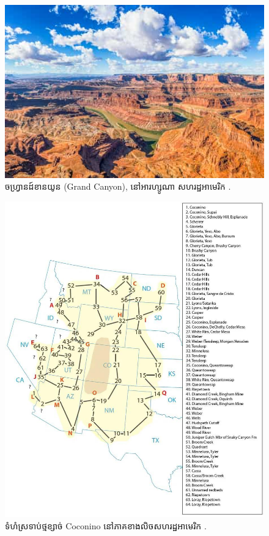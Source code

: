 \documentclass[10pt,twocolumn,letterpaper]{article}
\begin{document}
\begin{figure}[b]
\begin{center}
   \includegraphics[width=1\linewidth]{grand-canyon.jpg}

\end{center}
   \caption{ចហ្រ្វានដ៍ខានយូន (Grand Canyon), នៅអារហ្សូណា សហរដ្ឋអាមេរិក \cite{49}.}
\label{fig:2}
\label{fig:onecol}
\end{figure}

\begin{figure}[t]
\begin{center}
   \includegraphics[width=1\linewidth]{coconino.jpg}
\end{center}
   \caption{ទំហំស្រទាប់ថ្មខ្សាច់ Coconino នៅភាគខាងលិចសហរដ្ឋអាមេរិក \cite{21}.}
\label{fig:3}
\label{fig:onecol}
\end{figure}
\end{document}
